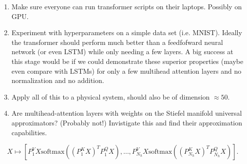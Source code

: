 \documentclass{article}
\begin{document}
\begin{enumerate}
    \item Make sure everyone can run transformer scripts on their laptops. Possibly on GPU. 
    \item Experiment with hyperparameters on a simple data set (i.e. MNIST). Ideally the transformer should perform much better than a feedfofward neural network (or even LSTM) while only needing a few layers. 
        A big success at this stage would be if we could demonstrate these superior properties (maybe even compare with LSTMs) for only a few multihead attention layers and no normalization and no addition. 
    \item Apply all of this to a physical system, should also be of dimension $\approx50$.

    \item Are multihead-attention layers with weights on the Stiefel manifold universal approximators? (Probably not!) Invistigate this and find their approximation capabilities.

\end{enumerate}

\begin{equation}
    X \mapsto [P^V_1X\mathrm{softmax}((P^K_1X)^TP^Q_1X), \ldots, P^V_{N_h}X\mathrm{softmax}((P^K_{N_h}X)^TP^Q_{N_h}X)].
\end{equation}
\end{document}
